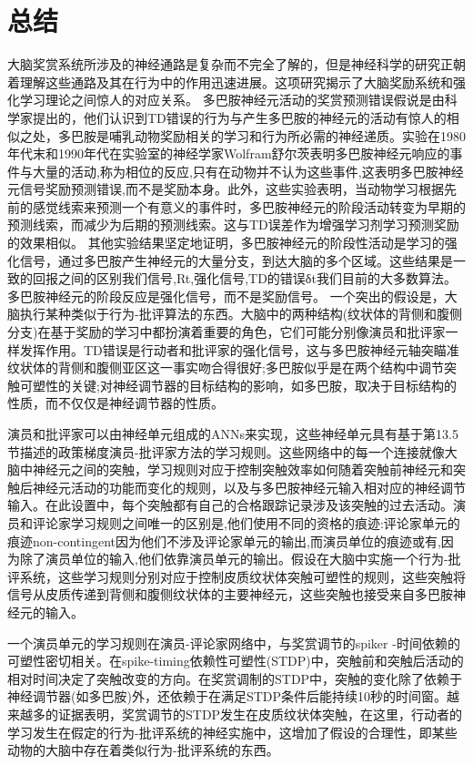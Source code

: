 \section{总结}

大脑奖赏系统所涉及的神经通路是复杂而不完全了解的，但是神经科学的研究正朝着理解这些通路及其在行为中的作用迅速进展。这项研究揭示了大脑奖励系统和强化学习理论之间惊人的对应关系。
多巴胺神经元活动的奖赏预测错误假说是由科学家提出的，他们认识到TD错误的行为与产生多巴胺的神经元的活动有惊人的相似之处，多巴胺是哺乳动物奖励相关的学习和行为所必需的神经递质。实验在1980年代末和1990年代在实验室的神经学家Wolfram舒尔茨表明多巴胺神经元响应的事件与大量的活动,称为相位的反应,只有在动物并不认为这些事件,这表明多巴胺神经元信号奖励预测错误,而不是奖励本身。此外，这些实验表明，当动物学习根据先前的感觉线索来预测一个有意义的事件时，多巴胺神经元的阶段活动转变为早期的预测线索，而减少为后期的预测线索。这与TD误差作为增强学习剂学习预测奖励的效果相似。
其他实验结果坚定地证明，多巴胺神经元的阶段性活动是学习的强化信号，通过多巴胺产生神经元的大量分支，到达大脑的多个区域。这些结果是一致的回报之间的区别我们信号,Rt,强化信号,TD的错误δt我们目前的大多数算法。多巴胺神经元的阶段反应是强化信号，而不是奖励信号。
一个突出的假设是，大脑执行某种类似于行为-批评算法的东西。大脑中的两种结构(纹状体的背侧和腹侧分支)在基于奖励的学习中都扮演着重要的角色，它们可能分别像演员和批评家一样发挥作用。TD错误是行动者和批评家的强化信号，这与多巴胺神经元轴突瞄准纹状体的背侧和腹侧亚区这一事实吻合得很好;多巴胺似乎是在两个结构中调节突触可塑性的关键;对神经调节器的目标结构的影响，如多巴胺，取决于目标结构的性质，而不仅仅是神经调节器的性质。

演员和批评家可以由神经单元组成的ANNs来实现，这些神经单元具有基于第13.5节描述的政策梯度演员-批评家方法的学习规则。这些网络中的每一个连接就像大脑中神经元之间的突触，学习规则对应于控制突触效率如何随着突触前神经元和突触后神经元活动的功能而变化的规则，以及与多巴胺神经元输入相对应的神经调节输入。在此设置中，每个突触都有自己的合格跟踪记录涉及该突触的过去活动。演员和评论家学习规则之间唯一的区别是,他们使用不同的资格的痕迹:评论家单元的痕迹non-contingent因为他们不涉及评论家单元的输出,而演员单位的痕迹或有,因为除了演员单位的输入,他们依靠演员单元的输出。假设在大脑中实施一个行为-批评系统，这些学习规则分别对应于控制皮质纹状体突触可塑性的规则，这些突触将信号从皮质传递到背侧和腹侧纹状体的主要神经元，这些突触也接受来自多巴胺神经元的输入。

一个演员单元的学习规则在演员-评论家网络中，与奖赏调节的spiker -时间依赖的可塑性密切相关。在spike-timing依赖性可塑性(STDP)中，突触前和突触后活动的相对时间决定了突触改变的方向。在奖赏调制的STDP中，突触的变化除了依赖于神经调节器(如多巴胺)外，还依赖于在满足STDP条件后能持续10秒的时间窗。越来越多的证据表明，奖赏调节的STDP发生在皮质纹状体突触，在这里，行动者的学习发生在假定的行为-批评系统的神经实施中，这增加了假设的合理性，即某些动物的大脑中存在着类似行为-批评系统的东西。

